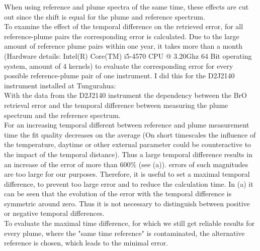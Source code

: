 When using reference and plume spectra of the same time, these effects are cut out since the shift is equal for the plume and reference spectrum.\\
To examine the effect of the temporal difference on the retrieved  error, for all reference-plume pairs the corresponding  error is calculated. Due to the large amount of reference plume pairs within one year, it takes more than a month (Hardware details: Intel(R) Core(TM) i5-4570 CPU @ 3.20Ghz 64 Bit operating system, amount of 4 kernels) to evaluate the corresponding  error for every possible reference-plume pair of one instrument. I did this for the  D2J2140 instrument installed at Tungurahua:\\
With the data from the D2J2140 instrument the dependency between the BrO retrieval error and the temporal difference between measuring the plume spectrum and the reference spectrum.\\
For an increasing temporal different between reference and plume measurement time the fit quality decreases on the average (On short timescales the influence of the temperature, daytime or other external parameter could be counteractive to the impact of the temporal distance). Thus a large temporal difference results in an increase of the   error of more than 600\% (see  (a)).
 errors of such magnitudes are too large for our purposes. Therefore, it is useful to set a maximal temporal difference, to prevent too large  error and to reduce the calculation time.
%
In  (a) it can be seen that the evolution of the   error with the temporal difference is symmetric around zero. Thus it is not necessary to distinguish between positive or negative temporal differences.
\\
To evaluate the maximal time difference, for which we still get reliable results for every plume, where the "same time reference" is contaminated, the alternative reference is chosen, which leads to the minimal  error.\\
